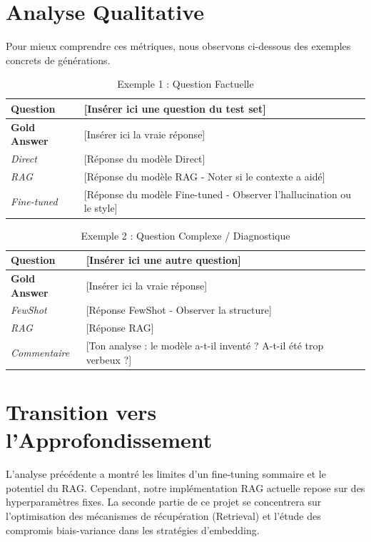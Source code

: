 \documentclass[a4paper,11pt]{article}
\begin{document}
\section{Analyse Qualitative}

Pour mieux comprendre ces métriques, nous observons ci-dessous des exemples concrets de générations.

\begin{table}[H]
    \centering
    \caption{Exemple 1 : Question Factuelle}
    \begin{tabular}{|p{}|p{}|}
    \hline
    \textbf{Question} & [Insérer ici une question du test set] \\ \hline
    \textbf{Gold Answer} & [Insérer ici la vraie réponse] \\ \hline
    \hline
    \textit{Direct} & [Réponse du modèle Direct] \\ \hline
    \textit{RAG} & [Réponse du modèle RAG - Noter si le contexte a aidé] \\ \hline
    \textit{Fine-tuned} & [Réponse du modèle Fine-tuned - Observer l'hallucination ou le style] \\ \hline
    \end{tabular}
\end{table}

\begin{table}[H]
    \centering
    \caption{Exemple 2 : Question Complexe / Diagnostique}
    \begin{tabular}{|p{}|p{}|}
    \hline
    \textbf{Question} & [Insérer ici une autre question] \\ \hline
    \textbf{Gold Answer} & [Insérer ici la vraie réponse] \\ \hline
    \hline
    \textit{FewShot} & [Réponse FewShot - Observer la structure] \\ \hline
    \textit{RAG} & [Réponse RAG] \\ \hline
    \textit{Commentaire} & [Ton analyse : le modèle a-t-il inventé ? A-t-il été trop verbeux ?] \\ \hline
    \end{tabular}
\end{table}

\section{Transition vers l'Approfondissement}

L'analyse précédente a montré les limites d'un fine-tuning sommaire et le potentiel du RAG. Cependant, notre implémentation RAG actuelle repose sur des hyperparamètres fixes.
La seconde partie de ce projet se concentrera sur l'optimisation des mécanismes de récupération (Retrieval) et l'étude des compromis biais-variance dans les stratégies d'embedding.
\end{document}
